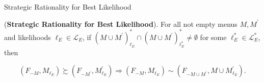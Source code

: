 \documentclass[usenames,dvipsnames,aspectratio=169,11pt, envcountsect, handout]{beamer}
\begin{document}
\begin{frame}{Strategic Rationality for Best Likelihood}
	\begin{axiom}\label{ax:srbl}

		(\textbf{Strategic Rationality for Best Likelihood}). For all not empty menus \( M, M^{\prime} \) and likelihoods \( \ell_E \in \mathcal{L}_{E} \), if \( \left( M \cup M^{\prime} \right)^{*}_{\ell_{E}} \cap \left( M \cup M^{\prime} \right)^{*}_{\ell^{*}_{E}} \neq \emptyset \) for some \( \ell_E^{*} \in \mathcal{L}_E^{*} \), then

		\[
			\left( F_{-M}, M_{\ell_{E}} \right) \succsim \left( F_{-M^{\prime}}, M^{\prime}_{\ell_{E}} \right) \Rightarrow \left( F_{-M}, M_{\ell_{E}} \right) \sim \left( F_{-M \cup M^{\prime}}, M \cup M^{\prime}_{\ell_{E}} \right) .
		\]

	\end{axiom} \pause


\end{frame}
\end{document}
